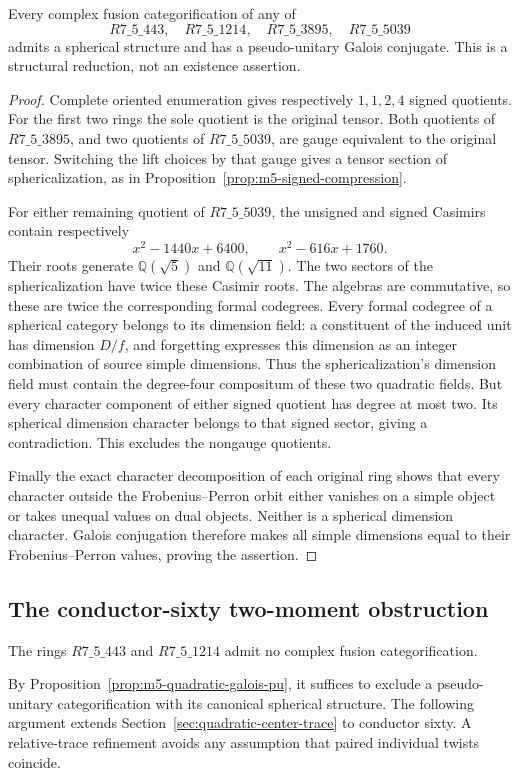 \begin{proposition}\label{prop:m5-quadratic-galois-pu}
Every complex fusion categorification of any of
\[
 R7\_5\_443,\quad R7\_5\_1214,\quad
 R7\_5\_3895,\quad R7\_5\_5039
\]
admits a spherical structure and has a pseudo-unitary Galois conjugate.
This is a structural reduction, not an existence assertion.
\end{proposition}
\begin{proof}
Complete oriented enumeration gives respectively $1,1,2,4$ signed
quotients.  For the first two rings the sole quotient is the original
tensor.  Both quotients of $R7\_5\_3895$, and two quotients of
$R7\_5\_5039$, are gauge equivalent to the original tensor.  Switching
the lift choices by that gauge gives a tensor section of sphericalization,
as in Proposition~\ref{prop:m5-signed-compression}.

For either remaining quotient of $R7\_5\_5039$, the unsigned and signed
Casimirs contain respectively
\[
 x^2-1440x+6400,\qquad x^2-616x+1760.
\]
Their roots generate $\mathbb Q(\sqrt5)$ and $\mathbb Q(\sqrt{11})$.
The two sectors of the sphericalization have twice these Casimir roots.
The algebras are commutative, so these are twice the corresponding formal
codegrees.  Every formal codegree of a spherical category belongs to its
dimension field: a constituent of the induced unit has dimension $D/f$,
and forgetting expresses this dimension as an integer combination of
source simple dimensions.  Thus the sphericalization's dimension field
must contain the degree-four compositum of these two quadratic fields.
But every character component of either signed quotient has degree at
most two.  Its spherical dimension character belongs to that signed
sector, giving a contradiction.  This excludes the nongauge quotients.

Finally the exact character decomposition of each original ring shows
that every character outside the Frobenius--Perron orbit either vanishes
on a simple object or takes unequal values on dual objects.  Neither is
a spherical dimension character.  Galois conjugation therefore makes
all simple dimensions equal to their Frobenius--Perron values, proving
the assertion.
\end{proof}

\subsection{The conductor-sixty two-moment obstruction}
\label{sec:m5-conductor-sixty}
\begin{theorem}\label{thm:m5-q60}
The rings $R7\_5\_443$ and $R7\_5\_1214$ admit no complex fusion
categorification.
\end{theorem}
By Proposition~\ref{prop:m5-quadratic-galois-pu}, it suffices to exclude
a pseudo-unitary categorification with its canonical spherical structure.
The following argument extends Section~\ref{sec:quadratic-center-trace}
to conductor sixty.  A relative-trace refinement avoids any assumption
that paired individual twists coincide.

